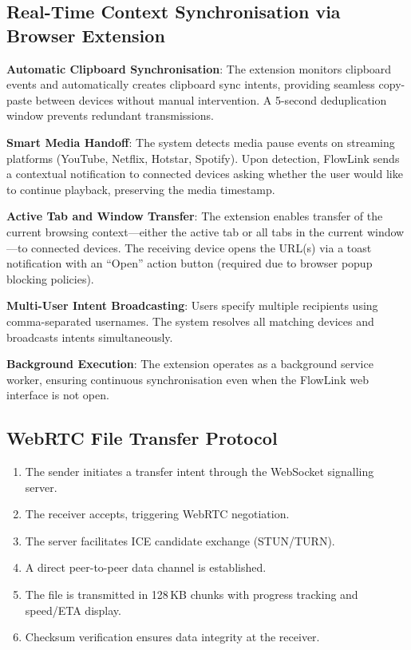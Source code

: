 \documentclass[conference]{IEEEtran}
\begin{document}
\subsection{Real-Time Context Synchronisation via Browser Extension}

\textbf{Automatic Clipboard Synchronisation}: The extension monitors clipboard events and automatically creates clipboard sync intents, providing seamless copy-paste between devices without manual intervention. A 5-second deduplication window prevents redundant transmissions.

\textbf{Smart Media Handoff}: The system detects media pause events on streaming platforms (YouTube, Netflix, Hotstar, Spotify). Upon detection, FlowLink sends a contextual notification to connected devices asking whether the user would like to continue playback, preserving the media timestamp.

\textbf{Active Tab and Window Transfer}: The extension enables transfer of the current browsing context---either the active tab or all tabs in the current window---to connected devices. The receiving device opens the URL(s) via a toast notification with an ``Open'' action button (required due to browser popup blocking policies).

\textbf{Multi-User Intent Broadcasting}: Users specify multiple recipients using comma-separated usernames. The system resolves all matching devices and broadcasts intents simultaneously.

\textbf{Background Execution}: The extension operates as a background service worker, ensuring continuous synchronisation even when the FlowLink web interface is not open.

\subsection{WebRTC File Transfer Protocol}

\begin{enumerate}
    \item The sender initiates a transfer intent through the WebSocket signalling server.
    \item The receiver accepts, triggering WebRTC negotiation.
    \item The server facilitates ICE candidate exchange (STUN/TURN).
    \item A direct peer-to-peer data channel is established.
    \item The file is transmitted in 128\,KB chunks with progress tracking and speed/ETA display.
    \item Checksum verification ensures data integrity at the receiver.
\end{enumerate}
\end{document}
